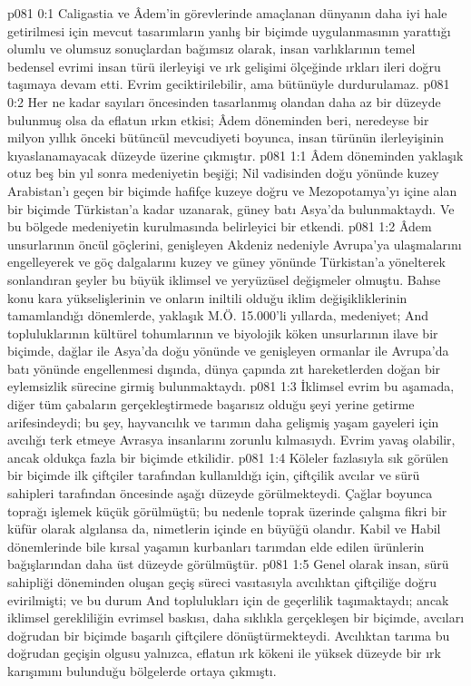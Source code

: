 \vs p081 0:1 Caligastia ve Âdem’in görevlerinde amaçlanan dünyanın daha iyi hale getirilmesi için mevcut tasarımların yanlış bir biçimde uygulanmasının yarattığı olumlu ve olumsuz sonuçlardan bağımsız olarak, insan varlıklarının temel bedensel evrimi insan türü ilerleyişi ve ırk gelişimi ölçeğinde ırkları ileri doğru taşımaya devam etti. Evrim geciktirilebilir, ama bütünüyle durdurulamaz.
\vs p081 0:2 Her ne kadar sayıları öncesinden tasarlanmış olandan daha az bir düzeyde bulunmuş olsa da eflatun ırkın etkisi; Âdem döneminden beri, neredeyse bir milyon yıllık önceki bütüncül mevcudiyeti boyunca, insan türünün ilerleyişinin kıyaslanamayacak düzeyde üzerine çıkmıştır.
\vs p081 1:1 Âdem döneminden yaklaşık otuz beş bin yıl sonra medeniyetin beşiği; Nil vadisinden doğu yönünde kuzey Arabistan’ı geçen bir biçimde hafifçe kuzeye doğru ve Mezopotamya’yı içine alan bir biçimde Türkistan’a kadar uzanarak, güney batı Asya’da bulunmaktaydı. Ve  bu bölgede medeniyetin kurulmasında belirleyici bir etkendi.
\vs p081 1:2 Âdem unsurlarının öncül göçlerini, genişleyen Akdeniz nedeniyle Avrupa’ya ulaşmalarını engelleyerek ve göç dalgalarını kuzey ve güney yönünde Türkistan’a yönelterek sonlandıran şeyler bu büyük iklimsel ve yeryüzüsel değişmeler olmuştu. Bahse konu kara yükselişlerinin ve onların iniltili olduğu iklim değişikliklerinin tamamlandığı dönemlerde, yaklaşık M.Ö. 15.000’li yıllarda, medeniyet; And topluluklarının kültürel tohumlarının ve biyolojik köken unsurlarının ilave bir biçimde, dağlar ile Asya’da doğu yönünde ve genişleyen ormanlar ile Avrupa’da batı yönünde engellenmesi dışında, dünya çapında zıt hareketlerden doğan bir eylemsizlik sürecine girmiş bulunmaktaydı.
\vs p081 1:3 İklimsel evrim bu aşamada, diğer tüm çabaların gerçekleştirmede başarısız olduğu şeyi yerine getirme arifesindeydi; bu şey, hayvancılık ve tarımın daha gelişmiş yaşam gayeleri için avcılığı terk etmeye Avrasya insanlarını zorunlu kılmasıydı. Evrim yavaş olabilir, ancak oldukça fazla bir biçimde etkilidir.
\vs p081 1:4 Köleler fazlasıyla sık görülen bir biçimde ilk çiftçiler tarafından kullanıldığı için, çiftçilik avcılar ve sürü sahipleri tarafından öncesinde aşağı düzeyde görülmekteydi. Çağlar boyunca toprağı işlemek küçük görülmüştü; bu nedenle toprak üzerinde çalışma fikri bir küfür olarak algılansa da, nimetlerin içinde en büyüğü olandır. Kabil ve Habil dönemlerinde bile kırsal yaşamın kurbanları tarımdan elde edilen ürünlerin bağışlarından daha üst düzeyde görülmüştür.
\vs p081 1:5 Genel olarak insan, sürü sahipliği döneminden oluşan geçiş süreci vasıtasıyla avcılıktan çiftçiliğe doğru evirilmişti; ve bu durum And toplulukları için de geçerlilik taşımaktaydı; ancak iklimsel gerekliliğin evrimsel baskısı, daha sıklıkla gerçekleşen bir biçimde, avcıları doğrudan bir biçimde başarılı çiftçilere dönüştürmekteydi. Avcılıktan tarıma bu doğrudan geçişin olgusu yalnızca, eflatun ırk kökeni ile yüksek düzeyde bir ırk karışımını bulunduğu bölgelerde ortaya çıkmıştı.

